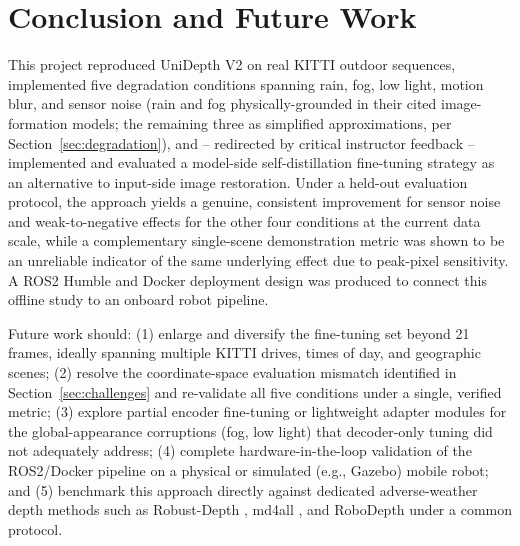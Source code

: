 \documentclass[conference]{IEEEtran}
\begin{document}
\section{Conclusion and Future Work}

This project reproduced UniDepth V2 on real KITTI outdoor sequences, implemented five degradation conditions spanning rain, fog, low light, motion blur, and sensor noise (rain and fog physically-grounded in their cited image-formation models; the remaining three as simplified approximations, per Section~\ref{sec:degradation}), and -- redirected by critical instructor feedback -- implemented and evaluated a model-side self-distillation fine-tuning strategy as an alternative to input-side image restoration. Under a held-out evaluation protocol, the approach yields a genuine, consistent improvement for sensor noise and weak-to-negative effects for the other four conditions at the current data scale, while a complementary single-scene demonstration metric was shown to be an unreliable indicator of the same underlying effect due to peak-pixel sensitivity. A ROS2 Humble and Docker deployment design was produced to connect this offline study to an onboard robot pipeline.

Future work should: (1) enlarge and diversify the fine-tuning set beyond 21 frames, ideally spanning multiple KITTI drives, times of day, and geographic scenes; (2) resolve the coordinate-space evaluation mismatch identified in Section~\ref{sec:challenges} and re-validate all five conditions under a single, verified metric; (3) explore partial encoder fine-tuning or lightweight adapter modules for the global-appearance corruptions (fog, low light) that decoder-only tuning did not adequately address; (4) complete hardware-in-the-loop validation of the ROS2/Docker pipeline on a physical or simulated (e.g., Gazebo) mobile robot; and (5) benchmark this approach directly against dedicated adverse-weather depth methods such as Robust-Depth \cite{ref11}, md4all \cite{ref12}, and RoboDepth \cite{ref13} under a common protocol.
\end{document}
